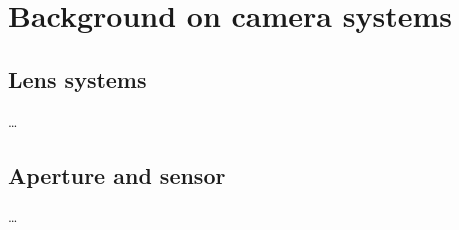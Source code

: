 \chapter{Background on camera systems}
\label{ch:background}

\section{Lens systems}

\dots

\section{Aperture and sensor}

\dots